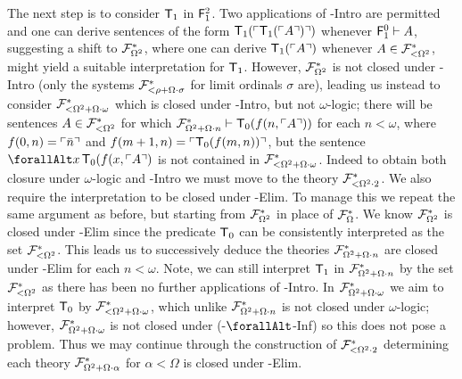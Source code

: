 \documentclass[UKenglish,cleveref,DIV=12]{scrartcl}
\let\forall\forallAlt
\theoremstyle{definition}
\theoremstyle{definition}
\begin{document}
The next step is to consider $\mathsf{T}_1$ in $\mathsf{F}_1^2$. Two applications of
-Intro are permitted and one can derive sentences of the form $\mathsf{T}_1(\ulcorner{\mathsf{T}_1(\ulcorner{A}\urcorner)}\urcorner)$
whenever $\mathsf{F}_1^0\vdash A$,  suggesting a
shift to $\mathcal{F}^*_{\Omega^2}$, where one can derive $\mathsf{T}_1(\ulcorner{A}\urcorner)$ whenever
$A\in\mathcal{F}^*_{<\Omega^2}$, might yield a suitable interpretation for $\mathsf{T}_1$. However,
$\mathcal{F}^*_{\Omega^2}$ is not closed under -Intro (only the systems
$\mathcal{F}^*_{<\rho+\Omega\cdot \sigma}$ for limit ordinals $\sigma$ are), leading us instead to consider
$\mathcal{F}^*_{<\Omega^2+\Omega\cdot\omega}$ which is closed under -Intro, but not
$\omega$-logic; there will be sentences $A\in\mathcal{F}^*_{<\Omega^2}$ for which
$\mathcal{F}^*_{\Omega^2+\Omega\cdot n}\vdash \mathsf{T}_0(f(n,\ulcorner{A}\urcorner))$ for each $n<\omega$, where
$f(0,n)=\ulcorner{\bar n}\urcorner$ and $f(m+1,n)=\ulcorner{\mathsf{T}_0({f(m,n)})}\urcorner$, but the sentence $\forall x\,
\T_0(f(x,\gn A)$ is not contained in $\mathcal{F}^*_{<\Omega^2+\Omega\cdot\omega}$. Indeed to obtain
both closure under $\omega$-logic and -Intro we must move to the theory
$\mathcal{F}^*_{<\Omega^2\cdot2}$. We also require the interpretation to be closed under
-Elim. To manage this we repeat the same argument as before, but starting
from $\mathcal{F}^*_{\Omega^2}$ in place of $\mathcal{F}^*_{\Omega}$. We know $\mathcal{F}^*_{\Omega^2}$ is closed
under -Elim since the predicate $\mathsf{T}_0$ can be consistently interpreted
as the set $\mathcal{F}^*_{<\Omega^2}$. This leads us to successively deduce the theories
$\mathcal{F}^*_{\Omega^2+\Omega\cdot n}$ are closed under -Elim for each
$n<\omega$. Note, we can still interpret $\mathsf{T}_1$ in $\mathcal{F}^*_{\Omega^2+\Omega\cdot n}$ by the set
$\mathcal{F}^*_{<\Omega^2}$  as there has been no further
applications of -Intro. In $\mathcal{F}^*_{\Omega^2+\Omega\cdot \omega}$ we aim to interpret
$\mathsf{T}_0$ by $\mathcal{F}^*_{<\Omega^2+\Omega\cdot \omega}$, which unlike $\mathcal{F}^*_{\Omega^2+\Omega\cdot n}$ is not closed
under $\omega$-logic; however, $\mathcal{F}^*_{\Omega^2+\Omega\cdot \omega}$ is not closed under
(-$\forall$-Inf) so this does not pose a problem. Thus we
may continue through the construction of $\mathcal{F}^*_{<\Omega^2\cdot2}$ determining
each theory $\mathcal{F}^*_{\Omega^2+\Omega\cdot \alpha}$ for $\alpha<\Omega$ is closed under
-Elim.
\end{document}
